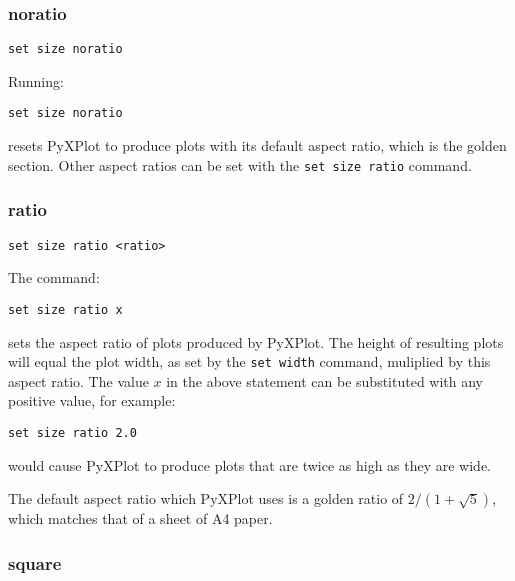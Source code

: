 \subsubsection{noratio}

\begin{verbatim}
set size noratio
\end{verbatim}

Running:

\begin{verbatim}
set size noratio
\end{verbatim}

\noindent resets PyXPlot to produce plots with its default aspect ratio, which is the
golden section. Other aspect ratios can be set with the {\tt set size ratio}
command.


\subsubsection{ratio}

\begin{verbatim}
set size ratio <ratio>
\end{verbatim}

The command:

\begin{verbatim}
set size ratio x
\end{verbatim}

\noindent sets the aspect ratio of plots produced by PyXPlot.  The height of resulting
plots will equal the plot width, as set by the {\tt set width} command,
muliplied by this aspect ratio. The value $x$ in the above statement can be
substituted with any positive value, for example:

\begin{verbatim}
set size ratio 2.0
\end{verbatim}

\noindent would cause PyXPlot to produce plots that are twice as high as they are wide.

The default aspect ratio which PyXPlot uses is a golden ratio of
$2/(1+\sqrt{5})$, which matches that of a sheet of A4 paper.


\subsubsection{square}

